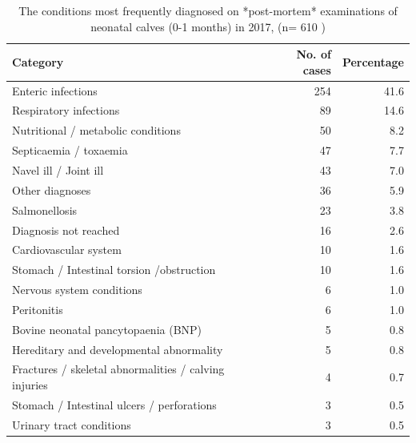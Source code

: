 \documentclass[]{book}
\begin{document}
\begin{table}

\caption{\label{tab:unnamed-chunk-6}The conditions most frequently diagnosed on *post-mortem* examinations of  neonatal calves (0-1 months) in 2017, (n= 610 )}
\centering
\begin{tabular}[t]{l|r|r}
\hline
Category & No. of cases & Percentage\\
\hline
Enteric infections & 254 & 41.6\\
\hline
Respiratory infections & 89 & 14.6\\
\hline
Nutritional / metabolic conditions & 50 & 8.2\\
\hline
Septicaemia / toxaemia & 47 & 7.7\\
\hline
Navel ill / Joint ill & 43 & 7.0\\
\hline
Other diagnoses & 36 & 5.9\\
\hline
Salmonellosis & 23 & 3.8\\
\hline
Diagnosis not reached & 16 & 2.6\\
\hline
Cardiovascular system & 10 & 1.6\\
\hline
Stomach / Intestinal  torsion /obstruction & 10 & 1.6\\
\hline
Nervous system conditions & 6 & 1.0\\
\hline
Peritonitis & 6 & 1.0\\
\hline
Bovine neonatal pancytopaenia (BNP) & 5 & 0.8\\
\hline
Hereditary and developmental abnormality & 5 & 0.8\\
\hline
Fractures / skeletal abnormalities / calving injuries & 4 & 0.7\\
\hline
Stomach / Intestinal  ulcers / perforations & 3 & 0.5\\
\hline
Urinary tract conditions & 3 & 0.5\\
\hline
\end{tabular}
\end{table}
\end{document}

